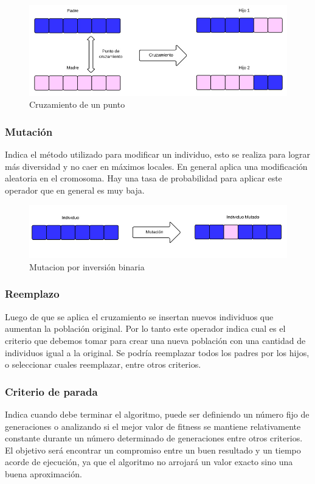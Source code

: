 \begin{figure}[h]
	\centering
	\includegraphics[width=\textwidth]{Figures/cruzamiento1}
	\caption{Cruzamiento de un punto}
	\label{fig:cruzamiento1}
\end{figure}

\subsubsection{Mutación} 
Indica el método utilizado para modificar un individuo, esto se realiza para lograr más diversidad y no caer en máximos locales. En general aplica una modificación aleatoria en el cromosoma. Hay una tasa de probabilidad para aplicar este operador que en general es muy baja. 
\begin{figure}[h]
	\centering
	\includegraphics[width=1\linewidth]{Figures/mutacion1}
	\caption{Mutacion por inversión binaria}
	\label{fig:mutacion1}
\end{figure}


\subsubsection{Reemplazo} 
Luego de que se aplica el cruzamiento se insertan nuevos individuos que aumentan la población original. Por lo tanto este operador indica cual es el criterio que debemos tomar para crear una nueva población con una cantidad de individuos igual a la original.
Se podría reemplazar todos los padres por los hijos, o seleccionar cuales reemplazar, entre otros criterios.

\subsubsection{Criterio de parada} 
Indica cuando debe terminar el algoritmo, puede ser definiendo un número fijo de generaciones o analizando si el mejor valor de fitness se mantiene relativamente constante durante un número determinado de generaciones entre otros criterios. El objetivo será encontrar un compromiso entre un buen resultado y un tiempo acorde de ejecución, ya que el algoritmo no arrojará un valor exacto sino una buena aproximación. 

